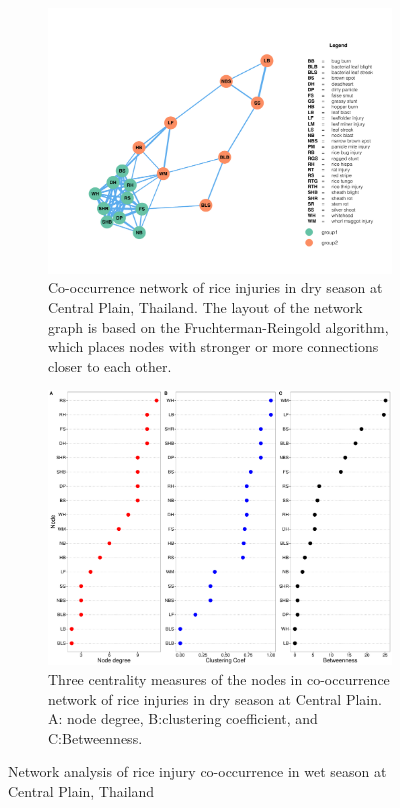 \begin{figure}
    \centering
    \begin{subfigure}[b]{1\textwidth}
        \includegraphics[width = 1\textwidth]{figures/networkCP_ds/networkCP_ds.pdf}
        \caption{Co-occurrence network of rice injuries in dry season at Central Plain, Thailand. The layout of the network graph is based on the Fruchterman-Reingold algorithm, which places nodes with stronger or more connections closer to each other.}
        \label{fig:networkCP_ds}
    \end{subfigure}
    \begin{subfigure}[b]{1\textwidth}
        \includegraphics[width = 1\textwidth]{figures/nodepropCP_ds/nodepropCP_ds.pdf}
        \caption{Three centrality measures of the nodes in co-occurrence network of rice injuries in dry season at Central Plain. A: node degree, B:clustering coefficient, and C:Betweenness.}
        \label{fig:nodepropCP_ds}
    \end{subfigure}
    \caption{Network analysis of rice injury co-occurrence in wet season at Central Plain, Thailand}
    \label{fig:CP_ds}
\end{figure}

